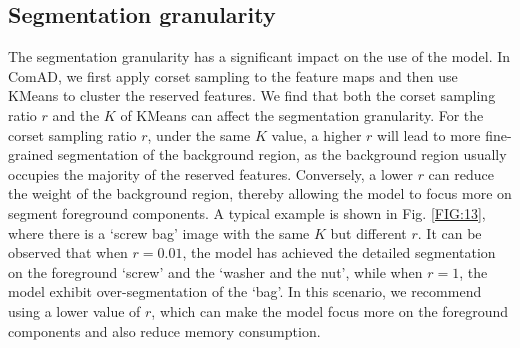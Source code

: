 \documentclass[final,5p,times,twocolumn]{elsarticle}
\begin{document}
\begin{table*}[t]
\caption{Quantitative comparisons of image-level detection results with different selected features on the logical anomaly detection benchmarks. The results are represented as (logical anomaly detection AUROC \%, structural anomaly detection AUROC \%) }
\centering
\label{Table8}
\end{table*}

\subsection{Segmentation granularity}
\label{5.2}
The segmentation granularity has a significant impact on the use of the model. In ComAD, we first apply corset sampling to the feature maps and then use KMeans to cluster the reserved features. We find that both the corset sampling ratio $r$ and the $K$ of KMeans can affect the segmentation granularity. 
For the corset sampling ratio $r$, under the same $K$ value, a higher $r$ will lead to more fine-grained segmentation of the background region, as the background region usually occupies the majority of the reserved features. Conversely, a lower $r$ can reduce the weight of the background region, thereby allowing the model to focus more on segment foreground components. A typical example is shown in Fig. \ref{FIG:13}, where there is a `screw bag' image with the same $K$ but different $r$. It can be observed that when $r=0.01$, the model has achieved the detailed segmentation on the foreground `screw' and the `washer and the nut', while when $r=1$, the model exhibit over-segmentation of the `bag'. In this scenario, we recommend using a lower value of $r$, which can make the model focus more on the foreground components and also reduce memory consumption.
\end{document}
